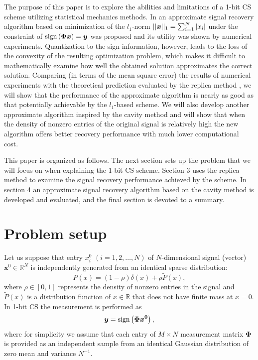 \documentclass[12pt]{iopart}
\newcommand{\vm}[1]{\boldsymbol{#1}}
\begin{document}
The purpose of this paper is to explore the abilities and limitations of a 1-bit CS scheme utilizing statistical mechanics methods. In \cite{1bitCS} an approximate signal recovery algorithm based on minimization of the $l_1$-norm $||\textrm{\boldmath $x$}||_1=\sum_{i=1}^N |x_i|$ under the constraint of $\mathrm{sign}\left(\textrm{\boldmath $\Phi x$}\right)=\textrm{\boldmath $y$}$ was proposed and its utility was shown by numerical experiments. Quantization to the sign information, however, leads to the loss of the convexity of the resulting optimization problem, which makes it difficult to mathematically examine how well the obtained solution approximates the correct solution. Comparing (in terms of the mean square error) the results of numerical experiments with the theoretical prediction evaluated by the replica method \cite{replica}, we will show that the performance of the approximate algorithm is nearly as good as %
that potentially achievable by the $l_1$-based scheme. We will also develop another approximate algorithm inspired by the cavity method \cite{cavity,MezardMontanari2009} and will show that when the density of nonzero entries of the original signal is relatively high the new algorithm offers better recovery performance with much lower computational cost. 

This paper is organized as follows. The next section sets up the problem that we will focus on when explaining the 1-bit CS scheme. Section 3 uses the replica method to examine the signal recovery performance achieved by the scheme. In section 4 an approximate signal recovery algorithm based on the cavity method is developed and evaluated, and the final section is devoted to a summary. 

\section{Problem setup}
Let us suppose that entry $x_i^0$ $(i=1,2,\ldots,N)$ of $N$-dimensional signal (vector) $\vm{x}^0 \in \mathbb{R}^N$ is independently generated from an identical sparse distribution:
\begin{equation}
P\left(x\right)=\left(1-\rho\right) \delta \left( x \right)
+ \rho \tilde{P} \left( x \right), 
\label{sparse}
\end{equation}
where $\rho \in [0,1]$ represents the density of nonzero entries in the signal and $\tilde{P} (x)$ is a distribution function of $x \in \mathbb{R}$ that does not have finite mass at $x=0$. In 1-bit CS the measurement is performed as 
\begin{equation}
\textrm{\boldmath $y$}=\mathrm{sign} \left( \textrm{\boldmath $\Phi x^{0}$} \right), 
\label{measurement}
\end{equation}
where for simplicity we assume that each entry of $M \times N$ measurement matrix $\vm{\Phi}$ is provided as an independent sample from an identical Gaussian distribution of zero mean and variance $N^{-1}$. 
\end{document}
